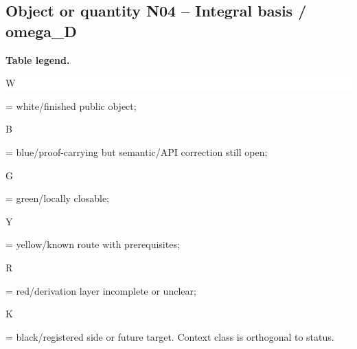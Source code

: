 \subsection*{Object or quantity N04 -- Integral basis /\allowbreak{} omega\_D}
\hypertarget{objproof:N04}{}
\par\smallskip\noindent\begin{minipage}{0.99\linewidth}\footnotesize\raggedright\textbf{Table legend.} \colorbox{white}{\strut W} = white/finished public object; \colorbox{cyan!20}{\strut B} = blue/proof-carrying but semantic/API correction still open; \colorbox{green!18}{\strut G} = green/locally closable; \colorbox{yellow!25}{\strut Y} = yellow/known route with prerequisites; \colorbox{red!20}{\strut R} = red/derivation layer incomplete or unclear; \colorbox{black!18}{\strut K} = black/registered side or future target. Context class is orthogonal to status.\end{minipage}\par\vspace{0.25em}
